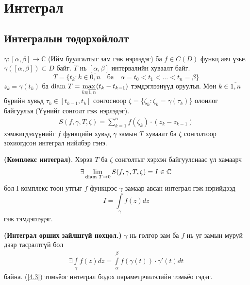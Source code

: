 \chapter{Интеграл} 
\section{Интегралын тодорхойлолт}
$\gamma :[\alpha,\beta]\rightarrow \mathbb{C}$ (Ийм буулгалтыг зам гэж нэрлэдэг) ба $f\in C(D)$ функц авч үзье. $\gamma ([\alpha, \beta])\subset D$ байг. $T$ нь $[\alpha, \beta]$ интервалийн хуваалт байг.
$$T=\{t_k:k\in\overline{0,n} \quad \text{ба} \quad \alpha =t_0<t_1<\ldots <t_n=\beta\}$$
$z_k=\gamma(t_k)$ ба $\textrm{\normalfont{diam} }T=\max\limits_{k\in \overline{1,n}} (t_k-t_{k-1})$ тэмдэглээнүүд оруулъя. Мөн $k\in\overline{1,n}$ бүрийн хувьд $\tau _k \in [t_{k-1}, t_k]$ сонгосноор $\zeta =\{ \zeta_k:\zeta_k=\gamma(\tau_k)\}$ олонлог байгуулъя (Үүнийг сонголт гэж нэрлэдэг).
\begin{eqnarray}
  S(f,\gamma ,T,\zeta)=\sum\limits_{k=1}^n f(\zeta_k)\cdot (z_k-z_{k-1})
\end{eqnarray}
хэмжигдэхүүнийг $f$ функцийн хувьд $\gamma$ замын $T$ хуваалт ба $\zeta$ сонголтоор зохиогдсон интеграл нийлбэр гэнэ.
\begin{dfn}
 \textbf{(Комплекс интеграл)}. Хэрэв $T$ ба $\zeta$ сонголтыг хэрхэн байгуулснаас үл хамаарч
 \begin{eqnarray}
   \exists \lim\limits_{\textrm{\normalfont{diam} }T\rightarrow 0}S(f,\gamma, T,\zeta)=I\in\mathbb{C}
 \end{eqnarray}
 бол I комплекс тоон утгыг $f$ функцээс $\gamma$ замаар авсан интеграл гэж нэрийдээд  $$I=\int\limits_\gamma f(z)dz$$ гэж тэмдэглэдэг.
\end{dfn}
\begin{thm}
 \textbf{(Интеграл орших зайлшгүй нөхцөл.)} $\gamma$ нь гөлгөр зам ба $f$ нь уг замын муруй дээр тасралтгүй бол
 \begin{eqnarray} \label{4.3}
   \exists \int\limits_{\gamma} f(z)dz=\int\limits_\alpha^\beta f(\gamma(t))\cdot \gamma '(t)dt 
 \end{eqnarray}
 байна. (\ref{4.3}) томьёог интеграл бодох параметрчилэлийн томьёо гэдэг.
\end{thm}
